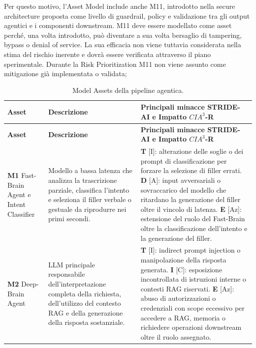 \documentclass[11pt,a4paper]{article}
\begin{document}
Per questo motivo, l'Asset Model include anche M11, introdotto nella
secure architecture proposta come livello di guardrail, policy e
validazione tra gli output agentici e i componenti downstream. M11
deve essere modellato come asset perché, una volta introdotto, può
diventare a sua volta bersaglio di tampering, bypass o denial of
service. La sua efficacia non viene tuttavia considerata nella stima
del rischio inerente e dovrà essere verificata attraverso il piano
sperimentale. Durante la Risk Prioritization M11 non viene assunto come mitigazione già
implementata o validata;

\begingroup
\setlength{\tabcolsep}{5pt}
\small
\begin{longtable}{|C{2.8cm}|L{4.2cm}|L{\dimexpr\textwidth-2.8cm-4.2cm-6\arrayrulewidth\relax}|}
\caption{Model Assets della pipeline agentica.}
\label{tab:model-assets}\\
\hline
\textbf{Asset} & \textbf{Descrizione} & \textbf{Principali minacce STRIDE-AI e Impatto $CIA^3$-R} \\
\hline
\endfirsthead
\hline
\textbf{Asset} & \textbf{Descrizione} & \textbf{Principali minacce STRIDE-AI e Impatto $CIA^3$-R} \\
\hline
\endhead

\textbf{M1} \newline Fast-Brain Agent e Intent Classifier & 
Modello a bassa latenza che analizza la trascrizione parziale, classifica l'intento e seleziona il filler verbale o gestuale da riprodurre nei primi secondi. & 
\textbf{T} [I]: alterazione delle soglie o dei prompt di classificazione per forzare la selezione di filler errati. \newline \textbf{D} [A]: input avversariali o sovraccarico del modello che ritardano la generazione del filler oltre il vincolo di latenza. \newline \textbf{E} [Az]: estensione del ruolo del Fast-Brain oltre la classificazione dell'intento e la generazione del filler. \\
\hline

\textbf{M2} \newline Deep-Brain Agent & 
LLM principale responsabile dell'interpretazione completa della richiesta, dell'utilizzo del contesto RAG e della generazione della risposta sostanziale. & 
\textbf{T} [I]: indirect prompt injection o manipolazione della risposta generata. \newline \textbf{I} [C]: esposizione incontrollata di istruzioni interne o contesti RAG riservati. \newline \textbf{E} [Az]: abuso di autorizzazioni o credenziali con scope eccessivo per accedere a RAG, memoria o richiedere operazioni downstream oltre il ruolo assegnato. \\
\hline


\end{longtable}
\end{document}

